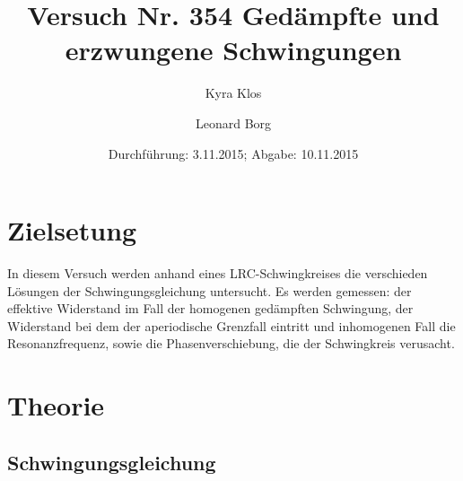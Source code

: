 

\title{Versuch Nr. 354 Gedämpfte und erzwungene Schwingungen}
\author{Kyra Klos \and Leonard Borg}
\date{Durchführung: 3.11.2015; Abgabe: 10.11.2015}


   \maketitle
   \section{Zielsetung}
   In diesem Versuch werden anhand eines LRC-Schwingkreises die verschieden Lösungen der Schwingungsgleichung untersucht.
   Es werden gemessen: der effektive Widerstand im Fall der homogenen gedämpften Schwingung,
   der Widerstand bei dem der aperiodische Grenzfall eintritt und inhomogenen Fall die Resonanzfrequenz, sowie die Phasenverschiebung,
   die der Schwingkreis verusacht.

   \section{Theorie}
   \label{sec:Theorie}
   \subsection{Schwingungsgleichung}
   \label{sub:Schwingungsgleichung}

